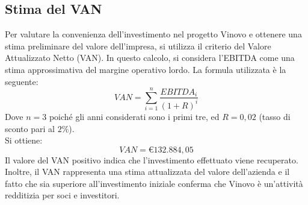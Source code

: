 \documentclass[12pt, a4paper]{article}
\newcommand{\meskip}{\medskip \\}
\begin{document}
\subsection{Stima del VAN}
Per valutare la convenienza dell'investimento nel progetto Vinovo e ottenere una stima preliminare del valore dell'impresa, si utilizza il criterio del Valore Attualizzato Netto (VAN). In questo calcolo, si considera l'EBITDA come una stima approssimativa del margine operativo lordo. La formula utilizzata è la seguente:
$$ VAN = \sum_{i = 1}^{n}{\frac{EBITDA_i}{(1+R)^i}}$$
Dove $n=3$ poiché gli anni considerati sono i primi tre, ed $R = 0,02$ (tasso di sconto pari al $2\%$).\meskip
Si ottiene:
$$ VAN = € 132.884,05 $$
Il valore del VAN positivo indica che l'investimento effettuato viene recuperato. Inoltre, il VAN rappresenta una stima attualizzata del valore dell'azienda e il fatto che sia superiore all'investimento iniziale conferma che Vinovo è un'attività redditizia per soci e investitori.
\end{document}
